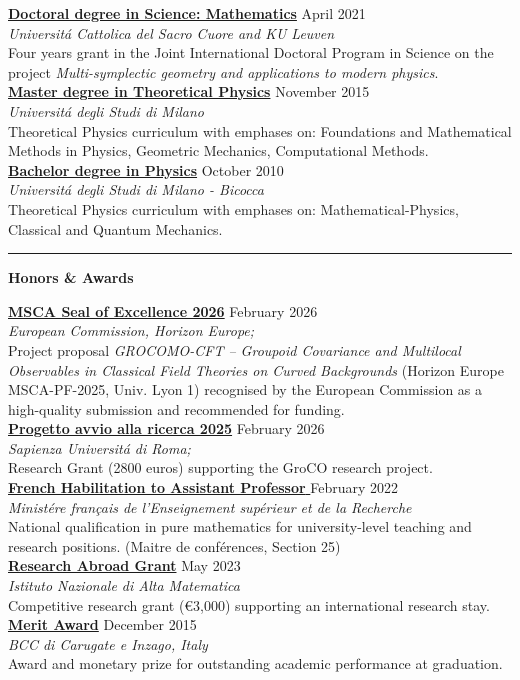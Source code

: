 \documentclass[a4paper]{article}
\newcommand{\block}[1]{\hrule \vspace{0.2cm} \textbf{\Large #1} \vspace{0.2cm}}
\newcommand{\voice}[5]{\href{#4}{\textbf{#1}} \hfill #2 \\ \textit{#3} \\ {\small #5} \vspace{0.2cm} \\}
\begin{document}
    
    \voice{Doctoral degree in Science: Mathematics}
        {April 2021}
        {Universit\'a Cattolica del Sacro Cuore and KU Leuven}
        {https://web.archive.org/save/http://scuoledidottorato.unicatt.it/phdschools/science-research-projects}       
        {Four years grant in the Joint International Doctoral Program in Science on the project \emph{Multi-symplectic geometry and applications to modern physics}. }
    \voice{Master degree in Theoretical Physics}
        {November 2015}
        {Universit\'a degli Studi di Milano}
        {https://fisica-lm.cdl.unimi.it/it}       
        {Theoretical Physics curriculum with emphases on: Foundations and Mathematical Methods in Physics, Geometric Mechanics, Computational Methods.}
    \voice{Bachelor degree in Physics}
        {October 2010}
        {Universit\'a degli Studi di Milano - Bicocca}
        {https://www.fisica.unimib.it/en}       
        {Theoretical Physics curriculum with emphases on: Mathematical-Physics, Classical and Quantum Mechanics.\vspace{-0.25cm}}


\clearpage

\block{Honors \& Awards}

\voice{MSCA Seal of Excellence 2026}
        {February 2026}
        {European Commission, Horizon Europe;}
        {https://www.dropbox.com/scl/fi/zr05hlqz8rpq4d9j51b7q/2602-MSCA-SealofExcellence.pdf?rlkey=ovu5ad8hmdjh9nkaqy8rmq3lb&st=wbag5jwb&dl=0}       
        {Project proposal \emph{GROCOMO-CFT – Groupoid Covariance and Multilocal Observables in Classical Field Theories on Curved Backgrounds} (Horizon Europe MSCA-PF-2025, Univ. Lyon 1) recognised by the European Commission as a high-quality submission and recommended for funding.}
\voice{Progetto avvio alla ricerca 2025}
        {February 2026}
        {Sapienza Universit\'a di Roma;}
        {https://www.dropbox.com/scl/fi/sgragjrgzdtfesdmhm4bv/2602-AvvioRicerca-Grant.pdf?rlkey=6iplpssiva66zkdw7qna4wl0c&st=x8jty2x7&dl=0}       
        {Research Grant (2800 euros) supporting the GroCO research project.}
\voice{French Habilitation to Assistant Professor }
  {February 2022}
  {Minist\'ere français de l'Enseignement sup\'erieur et de la Recherche}
  {https://www.galaxie.enseignementsup-recherche.gouv.fr/ensup/qualification/Resultats_2022/qualifies_MCF_2022.pdf}
  {National qualification in pure mathematics for university-level teaching and research positions. (Maitre de conf\'erences, Section 25)}
\voice{Research Abroad Grant}
  {May 2023}
  {Istituto Nazionale di Alta Matematica}
  {https://www.altamatematica.it/wp-content/uploads/2022/12/bando-estero-2022-2023-1.pdf}
  {Competitive research grant (€3,000) supporting an international research stay.}
\voice{Merit Award}
  {December 2015}
  {BCC di Carugate e Inzago, Italy}
  {https://web.archive.org/web/20191207203437/https://www.bccmilano.it/news/dettaglio_news_div.asp?i_menuID=54872&hNewsID=132411}
  {Award and monetary prize for outstanding academic performance at graduation.}
\end{document}
